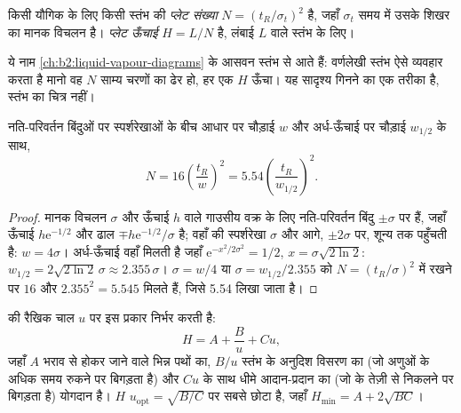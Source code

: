 \begin{definition}[प्लेट संख्या]\label{def:b2:chromatography:plates}
किसी यौगिक के लिए किसी स्तंभ की \emph{प्लेट संख्या} $N = (t_R/\sigma_t)^2$ है, जहाँ
$\sigma_t$ समय में उसके शिखर का मानक विचलन है। \emph{प्लेट ऊँचाई}
$H = L/N$ है, लंबाई $L$ वाले स्तंभ के लिए।
\end{definition}

ये नाम \cref{ch:b2:liquid-vapour-diagrams} के आसवन स्तंभ से आते हैं: वर्णलेखी
स्तंभ ऐसे व्यवहार करता है मानो वह $N$ साम्य चरणों का ढेर हो, हर एक $H$ ऊँचा। यह सादृश्य गिनने का
एक तरीका है, स्तंभ का चित्र नहीं।

\begin{proposition}[शिखर से प्लेट संख्या]\label{prop:b2:chromatography:plate-number}
नति-परिवर्तन बिंदुओं पर स्पर्शरेखाओं के बीच आधार पर चौड़ाई $w$ और अर्ध-ऊँचाई पर
चौड़ाई $w_{1/2}$ के साथ,
\begin{equation*}
N = 16\left(\frac{t_R}{w}\right)^2 = 5.54\left(\frac{t_R}{w_{1/2}}\right)^2.
\end{equation*}
\end{proposition}

\begin{proof}
मानक विचलन $\sigma$ और ऊँचाई $h$ वाले गाउसीय वक्र के लिए नति-परिवर्तन बिंदु $\pm\sigma$ पर हैं,
जहाँ ऊँचाई $h\mathrm e^{-1/2}$ और ढाल $\mp h\mathrm e^{-1/2}/\sigma$ है; वहाँ की स्पर्शरेखा
$\sigma$ और आगे, $\pm2\sigma$ पर, शून्य तक पहुँचती है: $w = 4\sigma$। अर्ध-ऊँचाई वहाँ मिलती है जहाँ
$\mathrm e^{-x^2/2\sigma^2} = 1/2$, $x = \sigma\sqrt{2\ln2}$: $w_{1/2} = 2\sqrt{2\ln2}\,\sigma \approx
2.355\,\sigma$। $\sigma = w/4$ या $\sigma = w_{1/2}/2.355$ को $N = (t_R/\sigma)^2$ में रखने पर
$16$ और $2.355^2 = 5.545$ मिलते हैं, जिसे 5.54 लिखा जाता है।
\end{proof}

\begin{proposition}[वान डीम्टर समीकरण]\label{prop:b2:chromatography:van-deemter}
  की रैखिक चाल $u$ पर इस प्रकार निर्भर करती है:
\begin{equation*}
H = A + \frac{B}{u} + Cu,
\end{equation*}
जहाँ $A$ भराव से होकर जाने वाले भिन्न पथों का, $B/u$ स्तंभ के अनुदिश विसरण का
(जो अणुओं के अधिक समय रुकने पर बिगड़ता है) और $Cu$  के साथ धीमे आदान-प्रदान का (जो
 के तेज़ी से निकलने पर बिगड़ता है) योगदान है। $H$ $u_{\mathrm{opt}} = \sqrt{B/C}$ पर सबसे छोटा है, जहाँ $H_{\min} =
A + 2\sqrt{BC}$।
\end{proposition}

